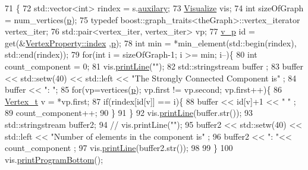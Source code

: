 \begin{DoxyCode}
71                                                           \{
72     std::vector<int> rindex = s.\hyperlink{struct_utility_structs_1_1_storage_items_afb9d346eaacb1c5e7f60f559c45910f2}{auxilary};
73     \hyperlink{class_visualize}{Visualize} vis;
74     \textcolor{keywordtype}{int} sizeOfGraph = num\_vertices(\hyperlink{class_pearce_a2320928312fd97f6bcb1f16684f79a03}{p}); 
75     \textcolor{keyword}{typedef} boost::graph\_traits<theGraph>::vertex\_iterator vertex\_iter;
76     std::pair<vertex\_iter, vertex\_iter> vp;
77     \hyperlink{utilities_8h_a3f4959b3d837fa6351a9414c79280286}{v\_p} \textcolor{keywordtype}{id} = \textcolor{keyword}{get}(&\hyperlink{struct_utility_structs_1_1_vertex_property_a636cb729438e999aa3d9a17ac39d8641}{VertexProperty::index} ,\hyperlink{class_pearce_a2320928312fd97f6bcb1f16684f79a03}{p});
78      \textcolor{keywordtype}{int} min = *min\_element(std::begin(rindex), std::end(rindex));
79     \textcolor{keywordflow}{for}(\textcolor{keywordtype}{int} i = sizeOfGraph-1; i >= min; i--)\{
80          \textcolor{keywordtype}{int} count\_component = 0;
81           vis.\hyperlink{class_visualize_abce6cd538dc0715b21851e0bf0377d85}{printLine}(\textcolor{stringliteral}{""});
82             std::stringstream buffer ;
83             buffer << std::setw(40) << std::left << \textcolor{stringliteral}{"The Strongly Connected Component is"} ;
84             buffer << \textcolor{stringliteral}{": "};
85           \textcolor{keywordflow}{for}(vp=vertices(\hyperlink{class_pearce_a2320928312fd97f6bcb1f16684f79a03}{p}); vp.first != vp.second; vp.first++)\{
86                  \hyperlink{utilities_8h_a344cd987714d06997f0becda3c96d6e2}{Vertex\_t} v = *vp.first;
87                 \textcolor{keywordflow}{if}(rindex[\textcolor{keywordtype}{id}[v]] == i)\{
88                     buffer << \textcolor{keywordtype}{id}[v]+1 <<  \textcolor{stringliteral}{" "} ;
89                     count\_component++;
90                 \}
91          \}
92         vis.\hyperlink{class_visualize_abce6cd538dc0715b21851e0bf0377d85}{printLine}(buffer.str());
93             std::stringstream buffer2;
94            \textcolor{comment}{// vis.printLine("");}
95             buffer2 << std::setw(40) << std::left << \textcolor{stringliteral}{"Number of elements in the component is"} ;
96             buffer2 << \textcolor{stringliteral}{": "}<< count\_component ;
97             vis.\hyperlink{class_visualize_abce6cd538dc0715b21851e0bf0377d85}{printLine}(buffer2.str());
98             
99     \}
100     vis.\hyperlink{class_visualize_ac0be9ece2d80a7d1e34724fb87424216}{printProgramBottom}();

\end{DoxyCode}
